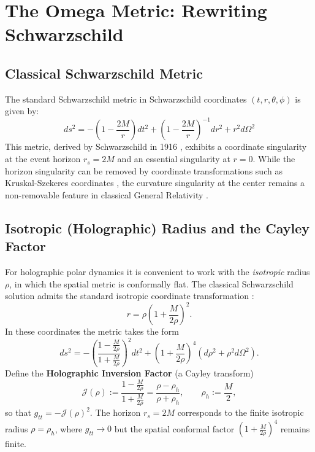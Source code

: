 \section{The Omega Metric: Rewriting Schwarzschild}
\label{sec:omega_metric}

\subsection{Classical Schwarzschild Metric}
The standard Schwarzschild metric in Schwarzschild coordinates $(t, r, \theta, \phi)$ is given by:
\begin{equation}
	    ds^2 = -\left(1 - \frac{2M}{r}\right)dt^2 + \left(1 - \frac{2M}{r}\right)^{-1}dr^2 + r^2 d\Omega^2
\end{equation}
This metric, derived by Schwarzschild in 1916 \cite{Schwarzschild1916}, exhibits a coordinate singularity at the event horizon $r_s = 2M$ and an essential singularity at $r=0$. While the horizon singularity can be removed by coordinate transformations such as Kruskal-Szekeres coordinates \cite{Kruskal1960}, the curvature singularity at the center remains a non-removable feature in classical General Relativity \cite{Penrose1965}.

\subsection{Isotropic (Holographic) Radius and the Cayley Factor}
For holographic polar dynamics it is convenient to work with the \emph{isotropic} radius $\rho$, in which the spatial metric is conformally flat. The classical Schwarzschild solution admits the standard isotropic coordinate transformation \cite{MisnerThorneWheeler1973, Wald1984}:
\begin{equation}
  r = \rho\left(1+\frac{M}{2\rho}\right)^2 .
\end{equation}
In these coordinates the metric takes the form
\begin{equation}
  ds^2 = -\left(\frac{1-\frac{M}{2\rho}}{1+\frac{M}{2\rho}}\right)^2 dt^2
  + \left(1+\frac{M}{2\rho}\right)^4 \left(d\rho^2+\rho^2 d\Omega^2\right).
\end{equation}
Define the \textbf{Holographic Inversion Factor} (a Cayley transform)
\begin{equation}
  \mathcal{J}(\rho) := \frac{1-\frac{M}{2\rho}}{1+\frac{M}{2\rho}}
  = \frac{\rho-\rho_h}{\rho+\rho_h},
  \qquad \rho_h:=\frac{M}{2},
\end{equation}
so that $g_{tt}=-\mathcal{J}(\rho)^2$. The horizon $r_s=2M$ corresponds to the finite isotropic radius $\rho=\rho_h$, where $g_{tt}\to 0$ but the spatial conformal factor $\left(1+\frac{M}{2\rho}\right)^4$ remains finite.

